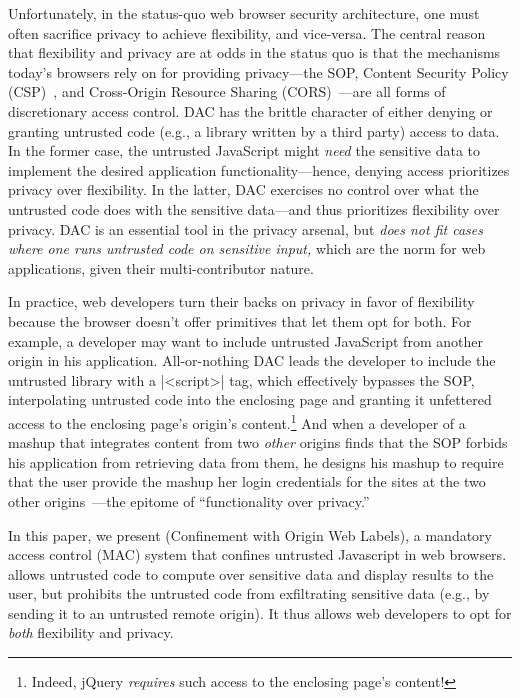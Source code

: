 Unfortunately, in the status-quo web browser security architecture,
one must often sacrifice privacy to achieve flexibility, and
vice-versa. The central reason that flexibility and privacy are at
odds in the status quo is that the mechanisms today's browsers rely on
for providing privacy---the SOP, Content Security Policy
(CSP)~\cite{csp}, and Cross-Origin Resource Sharing
(CORS)~\cite{cors13}---are all forms of discretionary access control.
DAC has the brittle character of either denying or granting
untrusted code (e.g., a library written by a third party) access to
data. In the former case, the untrusted JavaScript might {\em need}
the sensitive data to implement the desired application
functionality---hence, denying access prioritizes privacy over
flexibility. In the latter, DAC exercises no control over what the
untrusted code does with the sensitive data---and thus prioritizes
flexibility over privacy. DAC is an essential tool in the privacy
arsenal, but {\em does not fit cases where one runs untrusted code on
  sensitive input,} which are the norm for web applications, given
their multi-contributor nature.

In practice, web developers turn their backs on privacy in favor of
flexibility because the browser doesn't offer primitives that let them
opt for both. For example, a developer may want to include untrusted
JavaScript from another origin in his application. All-or-nothing DAC
leads the developer to include the untrusted library with a
\js|<script>| tag, which effectively bypasses the SOP, interpolating
untrusted code into the enclosing page and granting it unfettered
access to the enclosing page's origin's content.\footnote{Indeed,
  jQuery \emph{requires} such access to the enclosing page's content!}
And when a developer of a mashup that integrates content from two {\em
  other} origins finds that the SOP forbids his application from
retrieving data from them, he designs his mashup to require that the
user provide the mashup her login credentials for the sites at the two
other origins~\cite{mint.com}---the epitome of ``functionality over
privacy.''

In this paper, we present \sys{} (Confinement with Origin Web Labels),
a mandatory access control (MAC) system that confines untrusted
Javascript in web browsers. \sys{} allows untrusted code to compute
over sensitive data and display results to the user, but prohibits the
untrusted code from exfiltrating sensitive data (e.g., by sending it
to an untrusted remote origin). It thus allows web developers to opt
for {\em both} flexibility and privacy.

